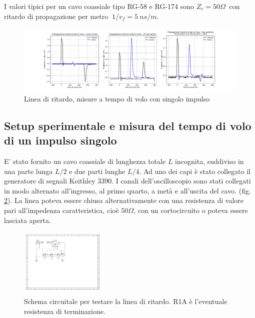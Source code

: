 \documentclass[journal]{IEEEtran}
\begin{document}
I valori tipici per un cavo coassiale tipo RG-58 e RG-174 sono $Z_c = 50 \Omega \ $ con ritardo di propagazione per metro $  \ 1/v_f = 5 \ ns/m $.

\begin{figure}[h]%
\centering
\begin{center}
\includegraphics[trim = {150pt 0 0 0}, width=1.1\textwidth]{analysis/output/Delay_line_pulse.pdf}
\caption{Linea di ritardo, misure a tempo di volo con singolo impulso}
\label{fig:singolo impulso}
\end{center}
\end{figure}


\subsection{Setup sperimentale e misura del tempo di volo  di un impulso singolo}
E' stato fornito un cavo coassiale di lunghezza totale $L$ incognita, suddiviso in una parte lunga $L/2$ e due parti lunghe $L/4$. Ad uno dei capi è stato collegato il generatore di segnali Keithley 3390. I canali dell'oscilloscopio sono stati collegati in modo alternato all'ingresso, al primo quarto, a metà e all'uscita del cavo. (fig. \ref{fig:linea di ritardo}). 
La linea poteva essere chiusa alternativamente con una resistenza di valore pari all'impedenza caratteristica, cioè $50 \Omega$, con un cortocircuito o poteva essere lasciata aperta.

\begin{figure}[H]%
\begin {center}
\includegraphics[width=0.38\textwidth]{sch-simulations/output/Transmission line.pdf}
\caption{Schema circuitale per testare la linea di ritardo. R1A è l'eventuale resistenza di terminazione.}
\label{fig:linea di ritardo}
\end {center}
\end{figure}
\end{document}
